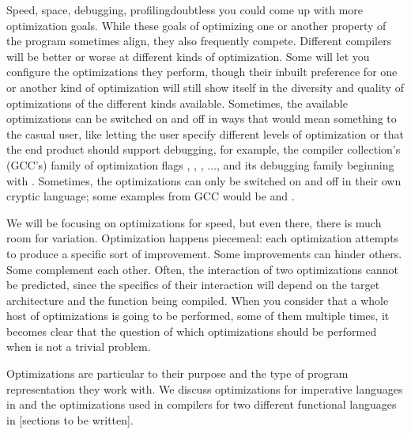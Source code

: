 Speed, space, debugging, profiling\empause doubtless you could come up with more optimization goals. While these goals of optimizing one or another property of the program sometimes align, they also frequently compete. Different compilers will be better or worse at different kinds of optimization. Some will let you configure the optimizations they perform, though their inbuilt preference for one or another kind of optimization will still show itself in the diversity and quality of optimizations of the different kinds available. Sometimes, the available optimizations can be switched on and off in ways that would mean something to the casual user, like letting the user specify different levels of optimization or that the end product should support debugging, for example, the  compiler collection's (GCC's) family of optimization flags , , , $\dotsc$,  and its debugging family beginning with . Sometimes, the optimizations can only be switched on and off in their own cryptic language; some examples from GCC would be  and .

We will be focusing on optimizations for speed, but even there, there is much room for variation. Optimization happens piecemeal: each optimization attempts to produce a specific sort of improvement. Some improvements can hinder others. Some complement each other. Often, the interaction of two optimizations cannot be predicted, since the specifics of their interaction will depend on the target architecture and the function being compiled. When you consider that a whole host of optimizations is going to be performed, some of them multiple times, it becomes clear that the question of which optimizations should be performed when is not a trivial problem.\label{background:compilers:middle-end:phase-ordering}

Optimizations are particular to their purpose and the type of program representation they work with. We discuss optimizations for imperative languages in  and the optimizations used in compilers for two different functional languages in [sections to be written].%
